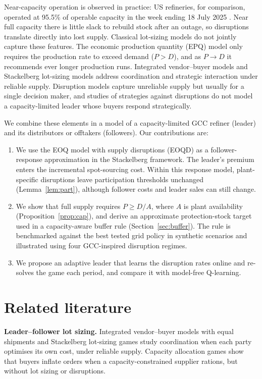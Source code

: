 \documentclass{ifacconf}
\newcommand{\rev}[1]{#1}
\newcommand{\MissingResult}{\ifmmode\text{\normalfont\color{red}\footnotesize[missing]}\else{\normalfont\color{red}\footnotesize[missing]}\fi}
\providecommand{\SensN}{\MissingResult}
\begin{document}
\rev{Near-capacity operation is observed in practice: US refineries, for comparison, operated at 95.5\% of operable capacity in the week ending 18 July 2025 \citep{eiautil2025}.} Near full capacity there is little slack to rebuild stock after an outage, so disruptions translate directly into lost supply. \rev{Classical lot-sizing models do not jointly capture these features.} The economic production quantity (EPQ) model only requires the production rate to exceed demand ($P>D$), and as $P\to D$ it recommends ever longer production runs. \rev{Integrated vendor--buyer models \citep{lu1995} and Stackelberg lot-sizing models \citep{romeijn2012} address coordination and strategic interaction under reliable supply.} Disruption models \citep{parlar1991,berk1994,qi2009,snyder2016} capture unreliable supply but usually for a single decision maker, and studies of strategies against disruptions \citep{tomlin2006} do not model a capacity-limited leader whose buyers respond strategically.

We combine these elements in a model of a capacity-limited GCC refiner (leader) and its distributors or offtakers (followers). Our contributions are:
\begin{enumerate}[label=(\roman*),leftmargin=*]
\item \rev{We use the EOQ model with supply disruptions (EOQD) \citep{parlar1991} as a follower-response approximation in the Stackelberg framework. The leader's premium enters the incremental spot-sourcing cost. Within this response model, plant-specific disruptions leave participation thresholds unchanged (Lemma~\ref{lem:part}), although follower costs and leader sales can still change.}
\item We show that full supply requires $P\ge D/A$, where $A$ is plant availability (Proposition~\ref{prop:cap}), \rev{and derive an approximate protection-stock target used in a capacity-aware buffer rule (Section~\ref{sec:buffer}). The rule is benchmarked against the best tested grid policy in \SensN{} synthetic scenarios and illustrated using four GCC-inspired disruption regimes.}
\item We propose an adaptive leader that learns the disruption rates online and re-solves the game each period, and compare it with model-free Q-learning.
\end{enumerate}

\section{Related literature}
\textbf{Leader--follower lot sizing.} Integrated vendor--buyer models with equal shipments \citep{lu1995} and Stackelberg lot-sizing games \citep{romeijn2012} study coordination when each party optimises its own cost, under reliable supply. Capacity allocation games \citep{cachon1999} show that buyers inflate orders when a capacity-constrained supplier rations, but without lot sizing or disruptions.
\end{document}
